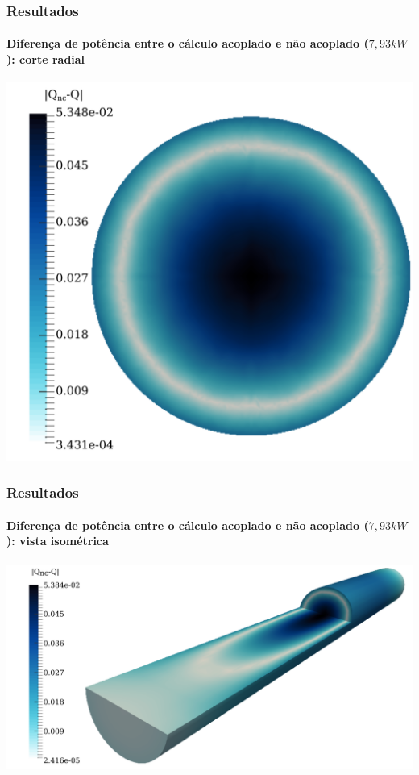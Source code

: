 \documentclass[svgnames,smaller,table]{beamer}
\begin{document}
\begin{frame}
  \frametitle{Resultados}
  \framesubtitle{Diferença de potência entre o cálculo acoplado e não acoplado ($7,93 kW$): corte radial}
  \centering\includegraphics[scale=0.5]{../figuras/diff-q-radial.png}
\end{frame}

\begin{frame}
  \frametitle{Resultados}
  \framesubtitle{Diferença de potência entre o cálculo acoplado e não acoplado ($7,93 kW$): vista isométrica}
  \centering\includegraphics[scale=0.4]{../figuras/diff-q-isometrico.png}
\end{frame}
\end{document}
